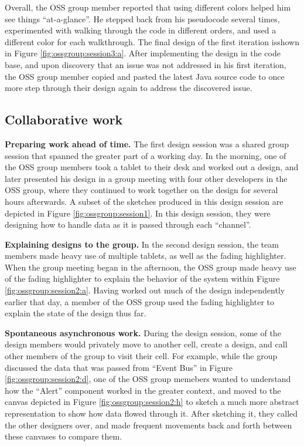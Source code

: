 Overall, the OSS group member reported that using different colors helped him see things ``at-a-glance''. He stepped back from his pseudocode several times, experimented with walking through the code in different orders, and used a different color for each walkthrough. The final design of the first iteration isshown in Figure \ref{fig:ossgroup:session3:a}. After implementing the design in the code base, and upon discovery that an issue was not addressed in his first iteration, the OSS group member copied and pasted the latest Java source code to once more step through their design again to address the discovered issue.

\subsection{Collaborative work}

\textbf{Preparing work ahead of time.} The first design session was a shared group session that spanned the greater part of a working day. In the morning, one of the OSS group members took a tablet to their desk and worked out a design, and later presented his design in a group meeting with four other developers in the OSS group, where they continued to work together on the design for several hours afterwards. A subset of the sketches produced in this design session are depicted in Figure \ref{fig:ossgroup:session1}. In this design session, they were designing how to handle data as it is passed through each ``channel''.

\textbf{Explaining designs to the group.} In the second design session, the team members made heavy use of multiple tablets, as well as the fading highlighter. When the group meeting began in the afternoon, the OSS group made heavy use of the fading highlighter to explain the behavior of the system within Figure \ref{fig:ossgroup:session2:a}. Having worked out much of the design independently earlier that day, a member of the OSS group used the fading highlighter to explain the state of the design thus far. 

\textbf{Spontaneous asynchronous work.} During the design session, some of the design members would privately move to another cell, create a design, and call other members of the group to visit their cell. For example, while the group discussed the data that was passed from ``Event Bus'' in Figure \ref{fig:ossgroup:session2:d}, one of the OSS group memebers wanted to understand how the ``Alert'' component worked in the greater context, and moved to the canvas depicted in Figure \ref{fig:ossgroup:session2:h} to sketch a much more abstract representation to show how data flowed through it. After sketching it, they called the other designers over, and made frequent movements back and forth between these canvases to compare them.

